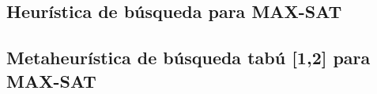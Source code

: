\documentclass[a4paper,10pt]{article}
\begin{document}
\begin{center}
\section*{Heur\'istica de b\'usqueda para MAX-SAT}
\end{center}


\begin{center}
\section*{Metaheur\'istica de b\'usqueda tab\'u [1,2] para MAX-SAT}
\end{center}
\end{document}
